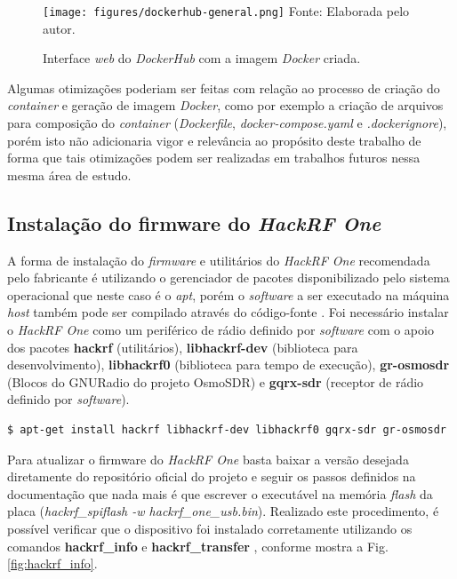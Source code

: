 \documentclass[
  12pt,				%
  openright,			%
  twoside,			%
  a4paper,			%
  english,			%
  french,				%
  spanish,			%
  brazil,				%
  ]{abntex2}
\begin{document}
\begin{figure}[!htb]
  \centering
  \caption{Interface \textit{web} do \textit{DockerHub} com a imagem \textit{Docker} criada.}
  \texttt{[image: figures/dockerhub-general.png]}
  Fonte: Elaborada pelo autor.
  \label{fig:dockerhub-general}
\end{figure}

Algumas otimizações poderiam ser feitas com relação ao processo de criação do \textit{container} e geração de imagem \textit{Docker}, como por exemplo a criação
de arquivos para composição do \textit{container} (\textit{Dockerfile}, \textit{docker-compose.yaml} e \textit{.dockerignore}), porém isto
não adicionaria vigor e relevância ao propósito deste trabalho de forma que tais otimizações podem ser realizadas em trabalhos futuros nessa mesma
área de estudo.

\subsection*{Instalação do firmware do \textit{HackRF One}}

A forma de instalação do \textit{firmware} e utilitários do \textit{HackRF One} recomendada pelo fabricante é utilizando o gerenciador de pacotes disponibilizado pelo
sistema operacional que neste caso é o \textit{apt}, porém o \textit{software} a ser executado na máquina \textit{host} também pode ser compilado através do código-fonte \cite{HACKRF-build-host-software}. Foi necessário instalar o \textit{HackRF One} como um periférico de rádio definido por \textit{software} com o
apoio dos pacotes \textbf{hackrf} (utilitários), \textbf{libhackrf-dev} (biblioteca para desenvolvimento), \textbf{libhackrf0} (biblioteca para tempo de execução),
\textbf{gr-osmosdr} (Blocos do GNURadio do projeto OsmoSDR) e \textbf{gqrx-sdr} (receptor de rádio definido por \textit{software}).

\begin{adjustbox}{max width=\linewidth}
  \begin{lstlisting}[language=bash]
  $ apt-get install hackrf libhackrf-dev libhackrf0 gqrx-sdr gr-osmosdr
\end{lstlisting}
\end{adjustbox}

Para atualizar o firmware do \textit{HackRF One} basta baixar a versão desejada diretamente do repositório oficial do projeto e seguir os passos
definidos na documentação \cite{HACKRF-updating-firmware} que nada mais é que escrever o executável na memória \textit{flash} da placa (\textit{hackrf\_spiflash -w hackrf\_one\_usb.bin}).
Realizado este procedimento, é possível verificar que o dispositivo foi instalado corretamente utilizando os comandos \textbf{hackrf\_info} e \textbf{hackrf\_transfer} \cite{HACKRF-tools}, conforme mostra a Fig. \ref{fig:hackrf_info}.
\end{document}

